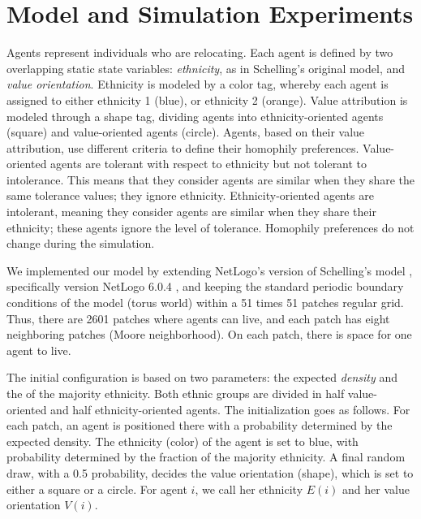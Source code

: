 \documentclass{ws-acs}
\begin{document}
{\section{Model and Simulation Experiments}
Agents represent individuals who are relocating. Each agent is defined by two overlapping static state variables: {\it ethnicity}, as in Schelling's original model, and {\it value orientation}. Ethnicity is modeled by a color tag, whereby each agent is assigned to either ethnicity 1 (blue), or ethnicity 2 (orange). Value attribution is modeled through a shape tag, dividing agents into ethnicity-oriented agents (square) and value-oriented agents (circle). Agents, based on their value attribution, use different criteria to define their homophily preferences. Value-oriented agents are tolerant with respect to ethnicity but not tolerant to intolerance. This means that they consider agents are similar when they share the same tolerance values; they ignore ethnicity. Ethnicity-oriented agents are intolerant, meaning they consider agents are similar when they share their ethnicity; these agents ignore the level of tolerance. Homophily preferences do not change during the simulation.

We implemented our model by extending NetLogo's version of Schelling's model \cite{Wilenskysm}, specifically version NetLogo 6.0.4 \cite{Wilenskynl}, and keeping the standard periodic boundary conditions of the model (torus world) within a 51 times 51 patches regular grid. Thus, there are 2601 patches where agents can live, and each patch has eight neighboring patches (Moore neighborhood). On each patch, there is space for one agent to live. 

The initial configuration is based on two parameters: the expected {\it density} and the {\itfraction of the majority ethnicity}. Both ethnic groups are divided in half value-oriented and half ethnicity-oriented agents.
The initialization goes as follows. For each patch, an agent is positioned there with a probability determined by the expected density. The ethnicity (color) of the agent is set to blue, with probability determined by the fraction of the majority ethnicity. A final random draw, with a 0.5 probability, decides the value orientation (shape), which is set to either a square or a circle. For agent $i$, we call her ethnicity $E(i)$ and her value orientation $V(i)$. 

}
\end{document}

